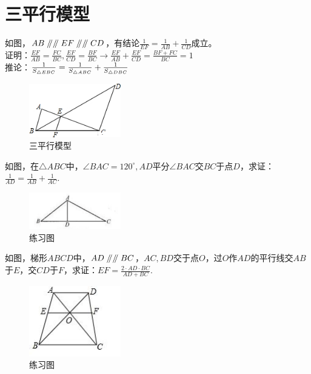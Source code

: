 \documentclass{ecnuthesis}
\newcommand\px{\mathrel{/\mkern-5mu/}}  %
\begin{document}
\section{三平行模型}
\begin{model}
    如图，$AB\px \px EF\px \px CD$，有结论$\frac{1}{EF}=\frac{1}{AB}+\frac{1}{CD}$成立。\\
    证明：$\frac{EF}{AB}=\frac{FC}{BC},\frac{EF}{CD}=\frac{BF}{BC}\rightarrow \frac{EF}{AB}+\frac{EF}{CD}=\frac{BF+FC}{BC}=1$ \\
    推论：$\frac{1}{S_{\triangle EBC}}=\frac{1}{S_{\triangle ABC}}+\frac{1}{S_{\triangle DBC}} \\$
\end{model}
\begin{figure}[H]
\centering
\includegraphics[width=4cm]{picture/805.png}
\caption{三平行模型}
\end{figure}
\begin{problem}
    如图，在$\triangle ABC$中，$\angle BAC=120^\circ,AD$平分$\angle BAC$交$BC$于点$D$，求证：$\frac{1}{AD}=\frac{1}{AB}+\frac{1}{AC}.$ \\
\end{problem}
\begin{figure}[H]
\centering
\includegraphics[width=4cm]{picture/806.png}
\caption{练习图}
\end{figure}
\begin{problem}
    如图，梯形$ABCD$中，$AD\px \px BC$，$AC,BD$交于点$O$，过$O$作$AD$的平行线交$AB$于$E$，交$CD$于$F$，求证：$EF=\frac{2·AD·BC}{AD+BC}.$\\
\end{problem}
\begin{figure}[H]
\centering
\includegraphics[width=4cm]{picture/807.jpg}
\caption{练习图}
\end{figure}
\clearpage
\end{document}
